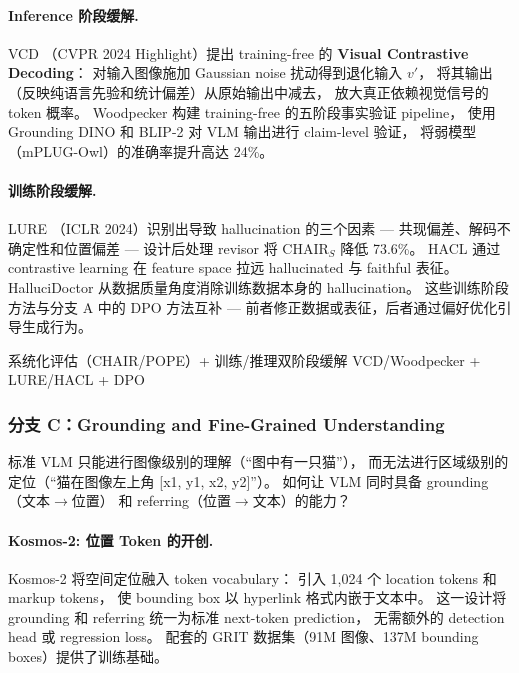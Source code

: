 \paragraph{Inference 阶段缓解.}
VCD \cite{leng2023vcd}（CVPR 2024 Highlight）提出 training-free 的 \textbf{Visual Contrastive Decoding}：
对输入图像施加 Gaussian noise 扰动得到退化输入 $v'$，
将其输出（反映纯语言先验和统计偏差）从原始输出中减去，
放大真正依赖视觉信号的 token 概率。
Woodpecker \cite{yin2023woodpecker} 构建 training-free 的五阶段事实验证 pipeline，
使用 Grounding DINO 和 BLIP-2 对 VLM 输出进行 claim-level 验证，
将弱模型（mPLUG-Owl）的准确率提升高达 24\%。

\paragraph{训练阶段缓解.}
LURE \cite{zhou2023lure}（ICLR 2024）识别出导致 hallucination 的三个因素 ---
共现偏差、解码不确定性和位置偏差 ---
设计后处理 revisor 将 CHAIR$_S$ 降低 73.6\%。
HACL \cite{jiang2023hacl} 通过 contrastive learning
在 feature space 拉远 hallucinated 与 faithful 表征。
HalluciDoctor \cite{yu2023hallucidoctor} 从数据质量角度消除训练数据本身的 hallucination。
这些训练阶段方法与分支 A 中的 DPO 方法互补 ---
前者修正数据或表征，后者通过偏好优化引导生成行为。

  {系统化评估（CHAIR/POPE）+ 训练/推理双阶段缓解}
  {VCD/Woodpecker + LURE/HACL + DPO}

\subsubsection{分支 C：Grounding and Fine-Grained Understanding}
\label{sec:t5-branch-c}

\begin{problembox}
标准 VLM 只能进行图像级别的理解（``图中有一只猫''），
而无法进行区域级别的定位（``猫在图像左上角 [x1, y1, x2, y2]''）。
如何让 VLM 同时具备 grounding（文本$\rightarrow$位置）
和 referring（位置$\rightarrow$文本）的能力？
\end{problembox}

\paragraph{Kosmos-2: 位置 Token 的开创.}
Kosmos-2 \cite{peng2023kosmos2} 将空间定位融入 token vocabulary：
引入 1,024 个 location tokens 和 markup tokens，
使 bounding box 以 hyperlink 格式内嵌于文本中。
这一设计将 grounding 和 referring 统一为标准 next-token prediction，
无需额外的 detection head 或 regression loss。
配套的 GRIT 数据集（91M 图像、137M bounding boxes）提供了训练基础。

